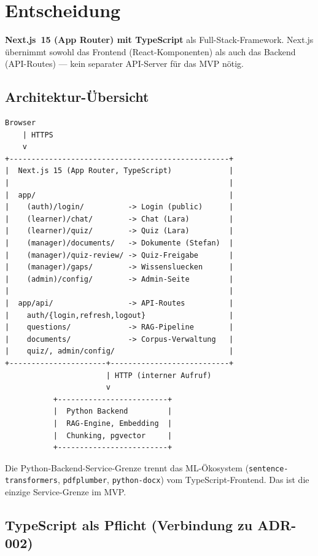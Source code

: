 \documentclass[a4paper, 11pt, oneside]{report}
\newcommand{\code}[1]{\texttt{\small #1}}
\begin{document}
\section{Entscheidung}

\textbf{Next.js~15 (App Router) mit TypeScript} als Full-Stack-Framework.
Next.js übernimmt sowohl das Frontend (React-Komponenten) als auch
das Backend (API-Routes) --- kein separater API-Server für das MVP nötig.

\subsection{Architektur-Übersicht}

\begin{lstlisting}[style=diagram]
Browser
    | HTTPS
    v
+--------------------------------------------------+
|  Next.js 15 (App Router, TypeScript)             |
|                                                  |
|  app/                                            |
|    (auth)/login/          -> Login (public)      |
|    (learner)/chat/        -> Chat (Lara)         |
|    (learner)/quiz/        -> Quiz (Lara)         |
|    (manager)/documents/   -> Dokumente (Stefan)  |
|    (manager)/quiz-review/ -> Quiz-Freigabe       |
|    (manager)/gaps/        -> Wissensluecken      |
|    (admin)/config/        -> Admin-Seite         |
|                                                  |
|  app/api/                 -> API-Routes          |
|    auth/{login,refresh,logout}                   |
|    questions/             -> RAG-Pipeline        |
|    documents/             -> Corpus-Verwaltung   |
|    quiz/, admin/config/                          |
+----------------------+---------------------------+
                       | HTTP (interner Aufruf)
                       v
           +-------------------------+
           |  Python Backend         |
           |  RAG-Engine, Embedding  |
           |  Chunking, pgvector     |
           +-------------------------+
\end{lstlisting}

Die Python-Backend-Service-Grenze trennt das ML-Ökosystem
(\code{sentence-transformers}, \code{pdfplumber}, \code{python-docx})
vom TypeScript-Frontend. Das ist die einzige Service-Grenze im MVP.

\subsection{TypeScript als Pflicht (Verbindung zu ADR-002)}
\end{document}
